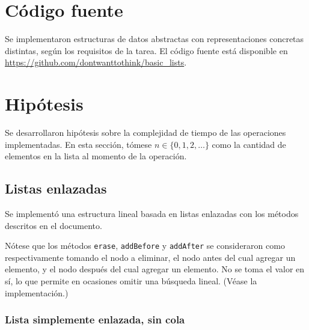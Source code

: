 
\maketitle{}

\tableofcontents{}

\newpage{}

\section{Código fuente}

Se implementaron estructuras de datos abstractas con representaciones concretas distintas, según los requisitos de la tarea. El código fuente está disponible en \url{https://github.com/dontwanttothink/basic_lists}.

\section{Hipótesis}

Se desarrollaron hipótesis sobre la complejidad de tiempo de las operaciones implementadas. En esta sección, tómese $n \in \{0, 1, 2, \dots{}\}$ como la cantidad de elementos en la lista al momento de la operación.

\subsection{Listas enlazadas}

Se implementó una estructura lineal basada en listas enlazadas con los métodos descritos en el documento.

\begin{tcolorbox}[title=Importante]
	Nótese que los métodos \texttt{erase}, \texttt{addBefore} y \texttt{addAfter} se consideraron como respectivamente tomando el nodo a eliminar, el nodo antes del cual agregar un elemento, y el nodo después del cual agregar un elemento. No se toma el valor en sí, lo que permite en ocasiones omitir una búsqueda lineal. (Véase la implementación.)
\end{tcolorbox}

\subsubsection{Lista simplemente enlazada, sin cola}

